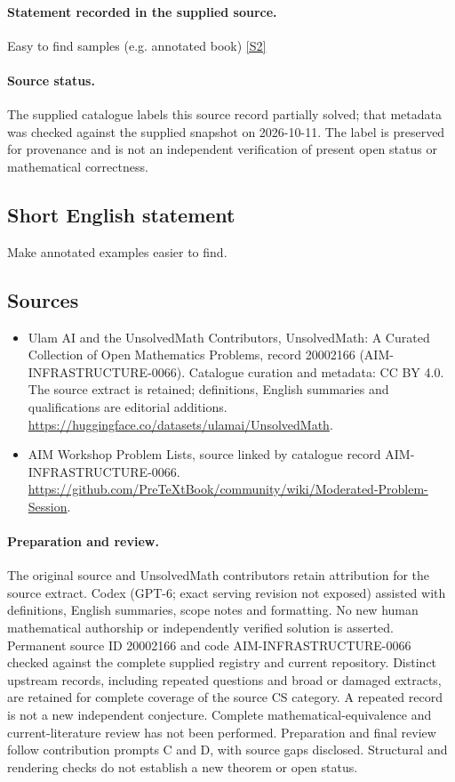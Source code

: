 \documentclass[11pt]{article}
\begin{document}
\paragraph{Statement recorded in the supplied source.}
Easy to find samples (e.g. annotated book) \href{https://github.com/PreTeXtBook/community/wiki/Moderated-Problem-Session}{[S2]}
\paragraph{Source status.}
The supplied catalogue labels this source record partially solved; that metadata was checked against the supplied snapshot on 2026-10-11. The label is preserved for provenance and is not an independent verification of present open status or mathematical correctness.
\subsection{Short English statement}
Make annotated examples easier to find.
\subsection{Sources}
\begin{itemize}
\item[S1] Ulam AI and the UnsolvedMath Contributors, UnsolvedMath: A Curated Collection of Open Mathematics Problems, record 20002166 (AIM-INFRASTRUCTURE-0066). Catalogue curation and metadata: CC BY 4.0. The source extract is retained; definitions, English summaries and qualifications are editorial additions.
\url{https://huggingface.co/datasets/ulamai/UnsolvedMath}.
\item[S2] AIM Workshop Problem Lists, source linked by catalogue record AIM-INFRASTRUCTURE-0066.
\url{https://github.com/PreTeXtBook/community/wiki/Moderated-Problem-Session}.
\end{itemize}
\paragraph{Preparation and review.}
The original source and UnsolvedMath contributors retain attribution for the source extract. Codex (GPT-6; exact serving revision not exposed) assisted with definitions, English summaries, scope notes and formatting. No new human mathematical authorship or independently verified solution is asserted. Permanent source ID 20002166 and code AIM-INFRASTRUCTURE-0066 checked against the complete supplied registry and current repository. Distinct upstream records, including repeated questions and broad or damaged extracts, are retained for complete coverage of the source CS category. A repeated record is not a new independent conjecture. Complete mathematical-equivalence and current-literature review has not been performed. Preparation and final review follow contribution prompts C and D, with source gaps disclosed. Structural and rendering checks do not establish a new theorem or open status.
\label{end:20002166}
\end{document}
